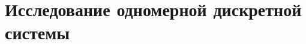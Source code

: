 \section{Исследование одномерной дискретной системы}


\clearpage

\clearpage

\clearpage

\clearpage

\clearpage

\clearpage